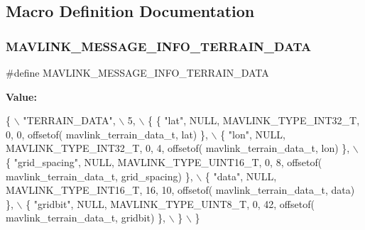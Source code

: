 \subsection{Macro Definition Documentation}
\mbox{\label{mavlink__msg__terrain__data_8h_a3427231d41054b06299cc148f5861697}} 
\subsubsection{M\+A\+V\+L\+I\+N\+K\+\_\+\+M\+E\+S\+S\+A\+G\+E\+\_\+\+I\+N\+F\+O\+\_\+\+T\+E\+R\+R\+A\+I\+N\+\_\+\+D\+A\+TA}
{\footnotesize\ttfamily \#define M\+A\+V\+L\+I\+N\+K\+\_\+\+M\+E\+S\+S\+A\+G\+E\+\_\+\+I\+N\+F\+O\+\_\+\+T\+E\+R\+R\+A\+I\+N\+\_\+\+D\+A\+TA}

{\bfseries Value\+:}
\begin{DoxyCode}
\{ \(\backslash\)
    \textcolor{stringliteral}{"TERRAIN\_DATA"}, \(\backslash\)
    5, \(\backslash\)
    \{  \{ \textcolor{stringliteral}{"lat"}, NULL, MAVLINK_TYPE_INT32_T, 0, 0, offsetof(
      mavlink_terrain_data_t, lat) \}, \(\backslash\)
         \{ \textcolor{stringliteral}{"lon"}, NULL, MAVLINK_TYPE_INT32_T, 0, 4, offsetof(
      mavlink_terrain_data_t, lon) \}, \(\backslash\)
         \{ \textcolor{stringliteral}{"grid\_spacing"}, NULL, MAVLINK_TYPE_UINT16_T, 0, 8, offsetof(
      mavlink_terrain_data_t, grid\_spacing) \}, \(\backslash\)
         \{ \textcolor{stringliteral}{"data"}, NULL, MAVLINK_TYPE_INT16_T, 16, 10, offsetof(
      mavlink_terrain_data_t, data) \}, \(\backslash\)
         \{ \textcolor{stringliteral}{"gridbit"}, NULL, MAVLINK_TYPE_UINT8_T, 0, 42, offsetof(
      mavlink_terrain_data_t, gridbit) \}, \(\backslash\)
         \} \(\backslash\)
\}
\end{DoxyCode}
\mbox{\label{mavlink__msg__terrain__data_8h_a338310d4d34befe6034733d43c17c886}} 
